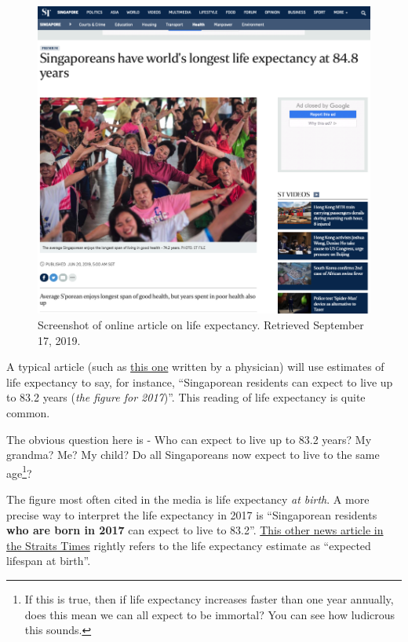 \documentclass[openany]{book}
\let\rmarkdownfootnote\footnote%
\def\footnote{\protect\rmarkdownfootnote}
\begin{document}
\begin{figure}

{\centering \includegraphics[width=0.8\linewidth]{images/apc/apc_lifeexpectancy} 

}

\caption{Screenshot of online article on life expectancy. Retrieved September 17, 2019.}\label{fig:apc-lifeexp}
\end{figure}

A typical article (such as
\href{https://www.healthxchange.sg/seniors/healthy-ageing/why-singaporeans-living-longer}{this
one} written by a physician) will use estimates of life expectancy to
say, for instance, ``Singaporean residents can expect to live up to 83.2
years (\emph{the figure for 2017})''. This reading of life expectancy is
quite common.

The obvious question here is - Who can expect to live up to 83.2 years?
My grandma? Me? My child? Do all Singaporeans now expect to live to the
same age\footnote{If this is true, then if life expectancy increases
  faster than one year annually, does this mean we can all expect to be
  immortal? You can see how ludicrous this sounds.}?

The figure most often cited in the media is life expectancy \emph{at
birth}. A more precise way to interpret the life expectancy in 2017 is
``Singaporean residents \textbf{who are born in 2017} can expect to live
to 83.2''.
\href{https://www.straitstimes.com/singapore/health/singapore-tops-in-life-expectancy-at-848-years}{This
other news article in the Straits Times} rightly refers to the life
expectancy estimate as ``expected lifespan at birth''.
\end{document}
